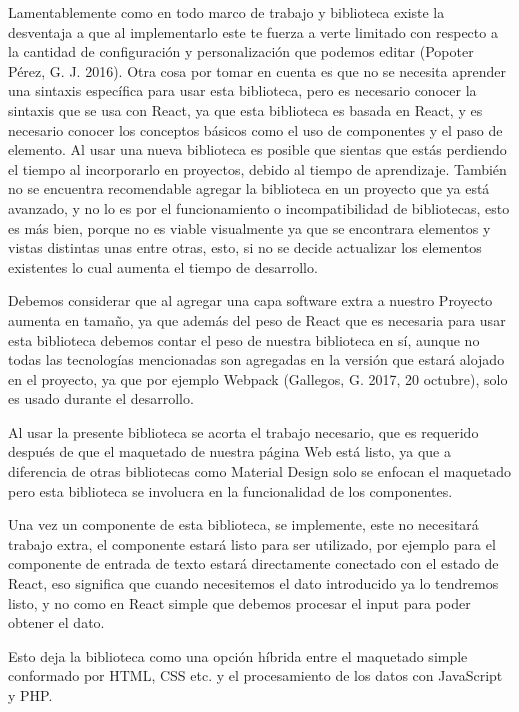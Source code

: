 Lamentablemente como en todo marco de trabajo y biblioteca existe la desventaja a que al implementarlo este te fuerza a verte limitado con respecto a la cantidad de configuración y personalización que podemos editar \cite{newTech} (Popoter Pérez, G. J. 2016). Otra cosa por tomar en cuenta es que no se necesita aprender una sintaxis específica para usar esta biblioteca, pero es necesario conocer la sintaxis que se usa con React, ya que esta biblioteca es basada en React, y es necesario conocer los conceptos básicos como el uso de componentes y el paso de elemento. Al usar una nueva biblioteca es posible que sientas que estás perdiendo el tiempo al incorporarlo en proyectos, debido al tiempo de aprendizaje. También no se encuentra recomendable agregar la biblioteca en un proyecto que ya está avanzado, y no lo es por el funcionamiento o incompatibilidad de bibliotecas, esto es más bien, porque no es viable visualmente ya que se encontrara elementos y vistas distintas unas entre otras, esto, si no se decide actualizar los elementos existentes lo cual aumenta el tiempo de desarrollo.


Debemos considerar que al agregar una capa software extra a nuestro Proyecto aumenta en tamaño, ya que además del peso de React que es necesaria para usar esta biblioteca debemos contar el peso de nuestra biblioteca en sí, aunque no todas  las tecnologías  mencionadas son agregadas en la versión que estará alojado en el proyecto, ya que por ejemplo Webpack \cite{webPack} (Gallegos, G. 2017, 20 octubre), solo es usado durante el desarrollo.

Al usar la presente biblioteca se acorta el trabajo necesario, que es requerido después de que el maquetado de nuestra página Web está listo, ya que a diferencia de otras bibliotecas  como Material Design solo se enfocan el maquetado pero esta biblioteca se involucra en la funcionalidad de los componentes.

Una vez un componente de esta biblioteca, se implemente,  este no necesitará trabajo extra, el componente estará listo para ser utilizado, por ejemplo para el componente de entrada de texto estará directamente conectado con el estado de React, eso significa que cuando necesitemos el dato introducido ya lo tendremos listo, y no como en React simple que debemos procesar el input para poder obtener el dato.

Esto deja la biblioteca como una opción híbrida entre el maquetado simple conformado por HTML, CSS etc. y el procesamiento de los datos con JavaScript y PHP.

\newpage